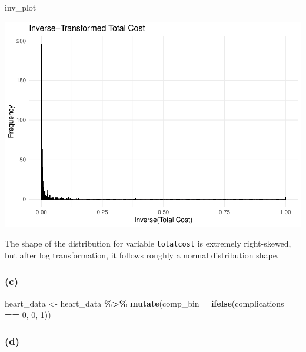 \documentclass[
]{article}
\newenvironment{Shaded}{\begin{snugshade}}{\end{snugshade}}
\newcommand{\AttributeTok}[1]{\textcolor[rgb]{0.13,0.29,0.53}{#1}}
\newcommand{\DecValTok}[1]{\textcolor[rgb]{0.00,0.00,0.81}{#1}}
\newcommand{\FunctionTok}[1]{\textcolor[rgb]{0.13,0.29,0.53}{\textbf{#1}}}
\newcommand{\NormalTok}[1]{#1}
\newcommand{\OtherTok}[1]{\textcolor[rgb]{0.56,0.35,0.01}{#1}}
\newcommand{\SpecialCharTok}[1]{\textcolor[rgb]{0.81,0.36,0.00}{\textbf{#1}}}
\begin{document}
\begin{Shaded}
\begin{Highlighting}[]
\NormalTok{inv\_plot}
\end{Highlighting}
\end{Shaded}

\includegraphics{p8130_hw4_xx2485_files/figure-latex/unnamed-chunk-11-3.pdf}

The shape of the distribution for variable \texttt{totalcost} is
extremely right-skewed, but after log transformation, it follows roughly
a normal distribution shape.

\subsubsection{(c)}\label{c-1}

\begin{Shaded}
\begin{Highlighting}[]
\NormalTok{heart\_data }\OtherTok{\textless{}{-}}\NormalTok{ heart\_data }\SpecialCharTok{\%\textgreater{}\%}
  \FunctionTok{mutate}\NormalTok{(}\AttributeTok{comp\_bin =} \FunctionTok{ifelse}\NormalTok{(complications }\SpecialCharTok{==} \DecValTok{0}\NormalTok{, }\DecValTok{0}\NormalTok{, }\DecValTok{1}\NormalTok{))}
\end{Highlighting}
\end{Shaded}

\subsubsection{(d)}\label{d-1}
\end{document}
